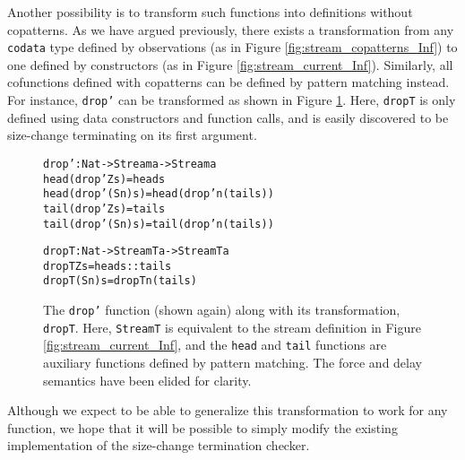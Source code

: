 Another possibility is to transform such functions into definitions without copatterns. As we have argued previously, there exists a transformation from any \texttt{codata} type defined by observations (as in Figure \ref{fig:stream_copatterns_Inf}) to one defined by constructors (as in Figure \ref{fig:stream_current_Inf}). Similarly, all cofunctions defined with copatterns can be defined by pattern matching instead. For instance, \texttt{drop'} can be transformed as shown in Figure \ref{fig:drop'_dropT}. Here, \texttt{dropT} is only defined using data constructors and function calls, and is easily discovered to be size-change terminating on its first argument. 

\begin{figure}
\begin{alltt}
drop' : Nat -> Stream a -> Stream a
head (drop' Z     s) = head s
head (drop' (S n) s) = head (drop' n (tail s))
tail (drop' Z     s) = tail s
tail (drop' (S n) s) = tail (drop' n (tail s))

dropT : Nat -> StreamT a -> StreamT a
dropT Z     s = head s :: tail s
dropT (S n) s = dropT n (tail s)
\end{alltt}
\caption{The \texttt{drop'} function (shown again) along with its transformation, \texttt{dropT}. Here, \texttt{StreamT} is equivalent to the stream definition in Figure \ref{fig:stream_current_Inf}, and the \texttt{head} and \texttt{tail} functions are auxiliary functions defined by pattern matching. The force and delay semantics have been elided for clarity.}
\label{fig:drop'_dropT}
\end{figure}

Although we expect to be able to generalize this transformation to work for any function, we hope that it will be possible to simply modify the existing implementation of the size-change termination checker.

